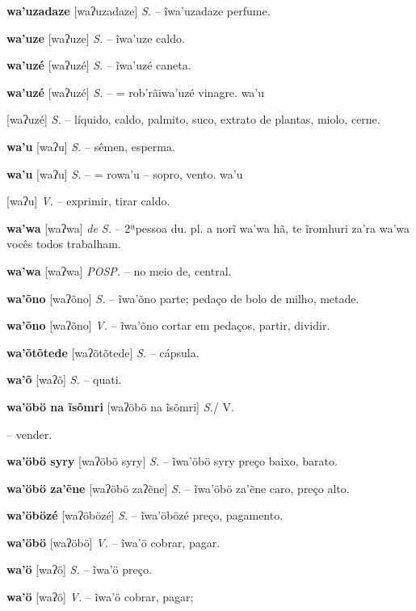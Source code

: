 {{{\textbf{wa'uzadaze} [waʔuzadaze] \textit{S.} -- ĩwa'uzadaze perfume.

\textbf{wa'uze} [waʔuze] \textit{S.} -- ĩwa'uze caldo.

\textbf{wa'uzé} [waʔuzé] \textit{S.} -- ĩwa'uzé caneta.

\textbf{wa'uzé} [waʔuzé] \textit{S.} -- = rob'rãiwa'uzé vinagre. wa'u} [waʔuzé] \textit{S.} -- líquido, caldo, palmito, suco, extrato de plantas, miolo, cerne.

\textbf{wa'u} [waʔu] \textit{S.} -- sêmen, esperma.

\textbf{wa'u} [waʔu] \textit{S.} -- = rowa'u -- sopro, vento. wa'u} [waʔu] \textit{V.} -- exprimir, tirar caldo.

\textbf{wa'wa} [waʔwa] \textit{de S.} -- 2ªpessoa du. pl. a norĩ wa'wa hã, te ĩromhuri za'ra wa'wa vocês todos trabalham.

\textbf{wa'wa} [waʔwa] \textit{POSP.} -- no meio de, central.

\textbf{wa'õno} [waʔõno] \textit{S.} -- ĩwa'õno parte; pedaço de bolo de milho, metade.

\textbf{wa'õno} [waʔõno] \textit{V.} -- ĩwa'õno cortar em pedaços, partir, dividir.

\textbf{wa'õtõtede} [waʔõtõtede] \textit{S.} -- cápsula.

\textbf{wa'õ} [waʔõ] \textit{S.} -- quati.

\textbf{wa'öbö na ĩsõmri} [waʔöbö na ĩsõmri] \textit{S.}/ V.} -- vender.

\textbf{wa'öbö syry} [waʔöbö syry] \textit{S.} -- ĩwa'öbö syry preço baixo, barato.

\textbf{wa'öbö za'ẽne} [waʔöbö zaʔẽne] \textit{S.} -- ĩwa'öbö za'ẽne caro, preço alto.

\textbf{wa'öbözé} [waʔöbözé] \textit{S.} -- ĩwa'öbözé preço, pagamento.

\textbf{wa'öbö} [waʔöbö] \textit{V.} -- ĩwa'ö cobrar, pagar.

\textbf{wa'ö} [waʔö] \textit{S.} -- ĩwa'ö preço.

\textbf{wa'ö} [waʔö] \textit{V.} -- ĩwa'ö cobrar, pagar;

